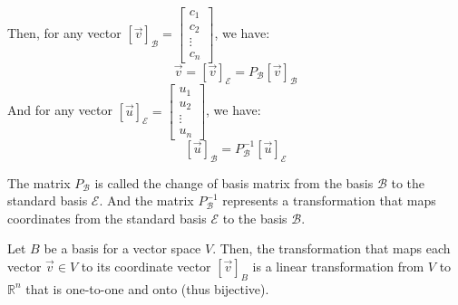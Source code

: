 Then, for any vector $[\vec{v}]_{\mathcal{B}} = \begin{bmatrix}
    c_1 \\ c_2 \\ \vdots \\ c_n
\end{bmatrix}$, we have:
\[ \vec{v} = [\vec{v}]_{\mathcal{E}} = P_{\mathcal{B}} [\vec{v}]_{\mathcal{B}} \]
And for any vector $[\vec{u}]_{\mathcal{E}} = \begin{bmatrix}
    u_1 \\ u_2 \\ \vdots \\ u_n
\end{bmatrix}$, we have:
\[ [\vec{u}]_{\mathcal{B}} = P_{\mathcal{B}}^{-1} [\vec{u}]_{\mathcal{E}} \]
\begin{definition}
    The matrix $P_{\mathcal{B}}$ is called the change of basis matrix from the basis $\mathcal{B}$ to the standard basis $\mathcal{E}$. And the matrix $P_{\mathcal{B}}^{-1}$ represents a transformation that maps coordinates from the standard basis $\mathcal{E}$ to the basis $\mathcal{B}$.
\end{definition}

\begin{theorem}
    Let $B$ be a basis for a vector space $V$. Then, the transformation that maps each vector $\vec{v} \in V$ to its coordinate vector $[\vec{v}]_B$ is a linear transformation from $V$ to $\mathbb{R}^n$ that is one-to-one and onto (thus bijective).
\end{theorem}